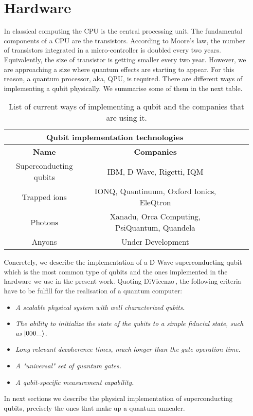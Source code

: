 
\chapter{Hardware} %
\label{AppendixC} %
In classical computing the CPU is the central processing unit. The fundamental components of a CPU are the transistors. According to Moore's law, the number of transistors integrated in a micro-controller is doubled every two years. Equivalently, the size of transistor is getting smaller every two year. However, we are approaching a size where quantum effects are starting to appear. For this reason, a quantum processor, aka, QPU, is required. There are different ways of implementing a qubit physically. We summarise some of them in the next table.
\begin{table}[H]
\centering
\begin{tabular}{ |c||c|c|c|c|  }
 \hline
 \multicolumn{2}{|c|}{\textbf{Qubit implementation technologies}} \\
 \hline
 \textbf{Name} & \textbf{Companies}  \\
 \hline
Superconducting qubits         & IBM, D-Wave, Rigetti, IQM \\
Trapped ions         & IONQ, Quantinuum, Oxford Ionics, EleQtron \\
Photons     & Xanadu, Orca Computing, PsiQuantum, Quandela \\
Anyons      & Under Development \\
 \hline
\end{tabular}
\caption{List of current ways of implementing a qubit and the companies that are using it.}
\label{tab:QubitTechnologies}
\end{table}
Concretely, we describe the implementation of a D-Wave superconducting qubit which is the most common type of qubits and the ones implemented in the hardware we use in the present work. Quoting DiVicenzo\,\cite{Divincenzo2000TheComputation}, the following criteria have to be fulfill for the realisation of a quantum computer:
\begin{displayquote}
\begin{itemize}
    \item \textit{A scalable physical system with well characterized qubits.}
    \item \textit{The ability to initialize the state of the qubits to a simple fiducial state, such as} $\ket{000...}$.
    \item \textit{Long relevant decoherence times, much longer than the gate operation time.}
    \item \textit{A "universal" set of quantum gates.}
    \item \textit{A qubit-specific measurement capability.}
\end{itemize}
\end{displayquote}
In next sections we describe the physical implementation of superconducting qubits, precisely the ones that make up a quantum annealer. 
